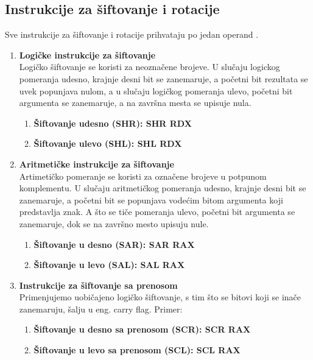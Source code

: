 \documentclass[a4paper]{article}
\begin{document}
\subsection{\textbf{Instrukcije za \v siftovanje i rotacije}}
Sve instrukcije za \v siftovanje i rotacije prihvataju po jedan operand \cite{x86Assembly}. \\ 
\begin{enumerate}
\item{\textbf{Logi\v cke instrukcije za \v siftovanje}}\\
Logi\v cko \v siftovanje se koristi za neozna\v cene brojeve.
U slu\v caju logickog pomeranja udesno, krajnje desni bit se zanemaruje, a po\v cetni bit rezultata 
se uvek popunjava nulom, a u slu\v caju logi\v ckog pomeranja ulevo, po\v cetni bit argumenta se zanemaruje, a na 
zavr\v sna mesta se upisuje nula. 

\begin{enumerate}
\item{\textbf{\v Siftovanje udesno (SHR): SHR RDX}}
\item{\textbf{\v Siftovanje ulevo (SHL): SHL RDX}}
\end{enumerate}

\item{\textbf{Aritmeti\v cke instrukcije za \v siftovanje}}\\
Artimeti\v cko pomeranje se koristi za ozna\v cene brojeve u potpunom komplementu.
U slu\v caju aritmeti\v ckog pomeranja udesno, krajnje desni bit se zanemaruje, a po\v cetni bit se popunjava
vode\' cim bitom argumenta koji predstavlja znak. A \v sto se ti\v ce pomeranja ulevo, po\v cetni bit argumenta se 
zanemaruje, dok se na zavr\v sno mesto upisuju nule.

\begin{enumerate}
\item{\textbf{\v Siftovanje u desno (SAR): SAR RAX}}
\item{\textbf{\v Siftovanje u levo (SAL): SAL RAX}}
\end{enumerate}

\item{\textbf{Instrukcije za \v siftovanje sa prenosom}} \\
Primenjujemo uobi\v cajeno logi\v cko \v siftovanje, s tim \v sto se bitovi koji se ina\v ce zanemaruju, \v salju u eng. carry 
flag. Primer:

\begin {enumerate}
\item {\textbf{\v Siftovanje u desno sa prenosom (SCR): SCR RAX}}
\item {\textbf{\v Siftovanje u levo sa prenosom (SCL): SCL RAX}}
\end{enumerate}


\end{enumerate}
\end{document}
